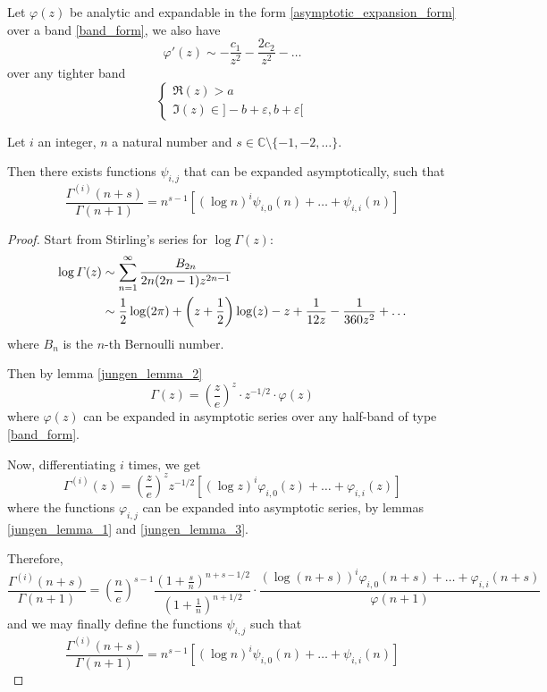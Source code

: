 \documentclass[../main.tex]{subfiles}
\begin{document}
\begin{lemma}{}\label{jungen_lemma_3}
	Let $\varphi(z)$ be analytic and expandable in the form \eqref{asymptotic_expansion_form} over a band \eqref{band_form}, we also have
	\[
	\varphi'(z) \sim -\frac{c_1}{z^2} - \frac{2c_2}{z^2} - \dots
	\]
	over any tighter band
	\begin{equation}
	\begin{cases}
	\Re(z) > a\\
	\Im(z) \in ]-b + \varepsilon, b + \varepsilon[
	\end{cases}
	\end{equation}
\end{lemma}

\begin{lemma}{}\label{lemma_quotient_gamma}
	Let $i$ an integer, $n$ a natural number and $s \in \mathbb{C} \setminus \{-1, -2, \dots\}$.

	Then there exists functions $\psi_{i, j}$ that can be expanded asymptotically, such that
	\begin{equation}
	\frac{\Gamma^{(i)}(n+s)}{\Gamma(n + 1)} = n^{s-1} [{(\log n)}^i \psi_{i, 0}(n) + \dots + \psi_{i, i}(n)]
	\end{equation}
\end{lemma}

\begin{proof}
	Start from Stirling's series for $\log \Gamma(z)$:
	\begin{align*}
	\log \Gamma(z) &\sim \sum\limits_{n=1}^\infty \frac{B_{2n}}{2n(2n-1)z^{2n-1}}\\
	&\sim \frac{1}{2} \log(2\pi) + \left(z + \frac{1}{2}\right) \log (z) - z + \frac{1}{12z} - \frac{1}{360z^2} + \dots
	\end{align*}
	where $B_n$ is the $n$-th Bernoulli number.
	
	Then by lemma \ref{jungen_lemma_2}
	\[
	\Gamma(z) = {\left(\frac{z}{e}\right)}^z \cdot z^{-1/2} \cdot \varphi(z)
	\]
	where $\varphi(z)$ can be expanded in asymptotic series over any half-band of type \eqref{band_form}.
	
	Now, differentiating $i$ times, we get
	\begin{equation*}
	\Gamma^{(i)}(z) = {\left(\frac{z}{e}\right)}^z z^{-1/2}
	\left[{(\log z)}^i \varphi_{i,0}(z) + \dots + \varphi_{i,i}(z) \right]
	\end{equation*}
	where the functions $\varphi_{i,j}$ can be expanded into asymptotic series, by lemmas \ref{jungen_lemma_1} and \ref{jungen_lemma_3}.
	
	Therefore,
	\begin{equation*}
	\frac{\Gamma^{(i)}(n+s)}{\Gamma(n + 1)} =
	{\left(\frac{n}{e}\right)}^{s - 1} \frac{{\left(1 + \frac{s}{n}\right)}^{n + s - 1/2}}{{\left(1 + \frac{1}{n}\right)}^{n + 1/2}}
	\cdot \frac{{(\log(n + s))}^i \varphi_{i,0}(n+s) + \dots + \varphi_{i,i}(n+s)}{\varphi(n + 1)}
	\end{equation*}
	and we may finally define the functions $\psi_{i, j}$ such that
	\[
	\frac{\Gamma^{(i)}(n+s)}{\Gamma(n + 1)} = n^{s-1} [{(\log n)}^i \psi_{i, 0}(n) + \dots + \psi_{i, i}(n)]
	\]
\end{proof}
\end{document}
